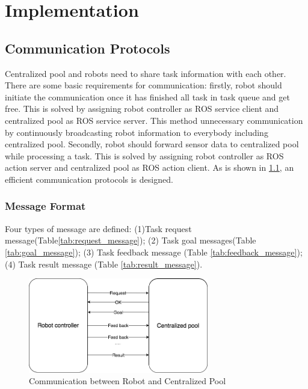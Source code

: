 \chapter{Implementation}


\section{Communication Protocols}


Centralized pool and robots need to share task information with each other. There are some basic requirements for communication: firstly,
robot should initiate the communication once it has finished all task in task queue and get free. This is solved by assigning robot controller as ROS service client and centralized pool as ROS service server.
This method unnecessary communication by continuously broadcasting robot information to everybody including centralized pool.
Secondly, robot should forward sensor data to centralized pool while processing a task. This is solved by assigning robot controller as ROS action server and centralized pool as ROS action client.
As is shown in \ref{fig:comminication}, an efficient communication protocols is designed. 

\subsection{Message Format}
Four types of message are defined: 
(1)Task request message(Table\ref{tab:request_message}); (2) Task goal messages(Table \ref{tab:goal_message}); (3) Task feedback message (Table \ref{tab:feedback_message}); (4) Task result message (Table \ref{tab:result_message}). 

\begin{figure}[htbp]
    \centering
    \includegraphics[width = 0.7\textwidth]{content/images/ch4/robot_pool_comminication.drawio.png}
    \caption{Communication between Robot and Centralized Pool}
    \label{fig:comminication}
\end{figure}


